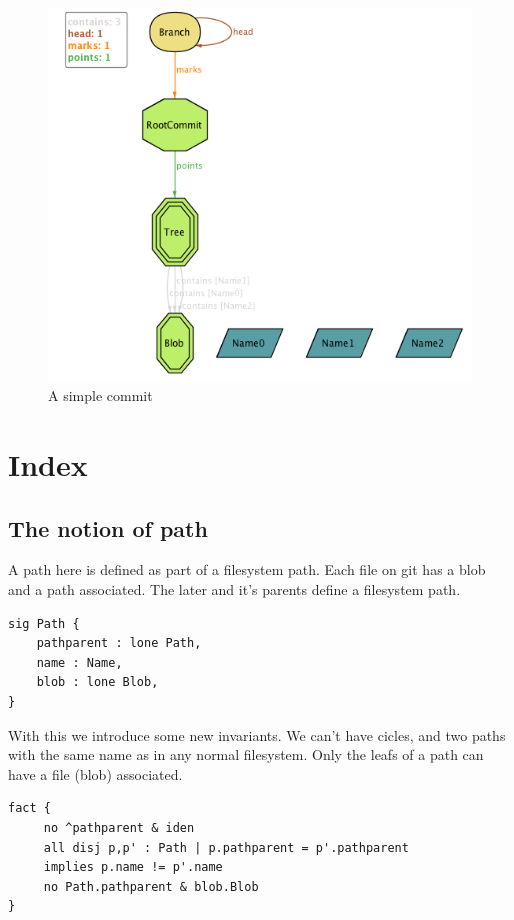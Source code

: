 \begin{figure}[h!]
	\caption{A simple commit}
  \centering
    \includegraphics[scale=0.65]{images/image1.png}
\end{figure}

\pagebreak
\section{Index}

\subsection{The notion of path}

A path here is defined as part of a filesystem path. 
Each file on git has a blob and a path associated. 
The later and it's parents define a filesystem path.

\begin{lstlisting}
sig Path {
	pathparent : lone Path,
	name : Name,
	blob : lone Blob,
}
\end{lstlisting}

With this we introduce some new invariants.
We can't have cicles, and two paths with the same
name as in any normal filesystem.
Only the leafs of a path can have a file (blob) associated.

\begin{lstlisting}
fact {
	 no ^pathparent & iden
	 all disj p,p' : Path | p.pathparent = p'.pathparent
	 implies p.name != p'.name
	 no Path.pathparent & blob.Blob
}
\end{lstlisting}

